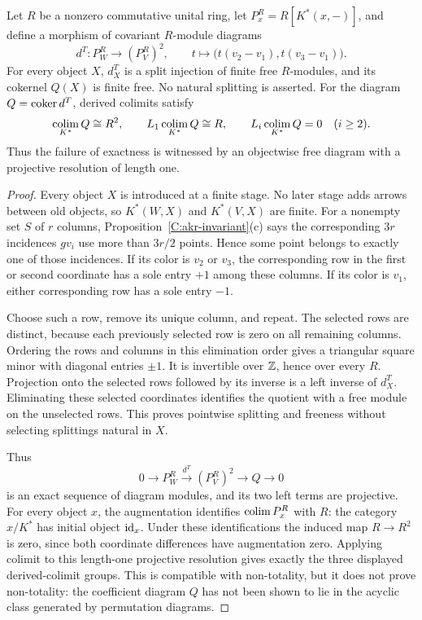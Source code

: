 \begin{proposition}
\label{C:akr-split-column}
Let $R$ be a nonzero commutative unital ring, let
$P_x^R=R[K^*(x,-)]$, and define a morphism of covariant
$R$-module diagrams
\[
 d^T:P_W^R\longrightarrow(P_V^R)^2,\qquad
 t\longmapsto\bigl(t(v_2-v_1),t(v_3-v_1)\bigr).
\]
For every object $X$, $d^T_X$ is a split injection of finite
free $R$-modules, and its cokernel $Q(X)$ is finite free.
No natural splitting is asserted. For the diagram
$Q=\operatorname{coker} d^T$, derived colimits satisfy
\[
 \operatorname*{colim}_{K^*}Q\cong R^2,\qquad
 L_1\operatorname*{colim}_{K^*}Q\cong R,\qquad
 L_i\operatorname*{colim}_{K^*}Q=0\quad(i\geq2).
\]
Thus the failure of exactness is witnessed by an objectwise
free diagram with a projective resolution of length one.
\end{proposition}
\begin{proof}
Every object $X$ is introduced at a finite stage. No later
stage adds arrows between old objects, so $K^*(W,X)$ and
$K^*(V,X)$ are finite. For a nonempty set $S$ of $r$ columns,
Proposition~\ref{C:akr-invariant}(c) says the corresponding
$3r$ incidences $gv_i$ use more than $3r/2$ points. Hence
some point belongs to exactly one of those incidences. If its
color is $v_2$ or $v_3$, the corresponding row in the first
or second coordinate has a sole entry $+1$ among these
columns. If its color is $v_1$, either corresponding row
has a sole entry $-1$.

Choose such a row, remove its unique column, and repeat.
The selected rows are distinct, because each previously
selected row is zero on all remaining columns. Ordering the
rows and columns in this elimination order gives a triangular
square minor with diagonal entries $\pm1$. It is invertible
over $\mathbb Z$, hence over every $R$. Projection onto the selected
rows followed by its inverse is a left inverse of $d_X^T$.
Eliminating these selected coordinates identifies the quotient
with a free module on the unselected rows. This proves
pointwise splitting and freeness without selecting splittings
natural in $X$.

Thus
\[
 0\longrightarrow P_W^R\xrightarrow{d^T}(P_V^R)^2
 \longrightarrow Q\longrightarrow0
\]
is an exact sequence of diagram modules, and its two left
terms are projective. For every object $x$, the augmentation
identifies $\operatorname*{colim} P_x^R$ with $R$: the category $x/K^*$ has
initial object $\operatorname{id}_x$. Under these identifications the
induced map $R\to R^2$ is zero, since both coordinate
differences have augmentation zero. Applying colimit to
this length-one projective resolution gives exactly the
three displayed derived-colimit groups. This is compatible
with non-totality, but it does not prove non-totality: the
coefficient diagram $Q$ has not been shown to lie in the
acyclic class generated by permutation diagrams.
\end{proof}
